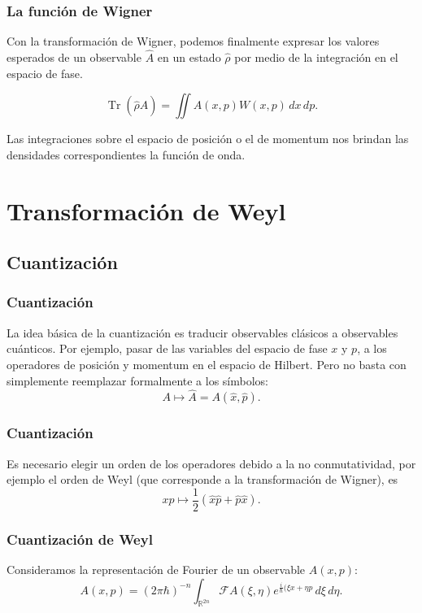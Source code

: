 \documentclass{beamer}
\DeclareMathOperator{\R}{\mathbb{R}}
\DeclareMathOperator{\Tr}{Tr}
\begin{document}
\begin{frame}
  \frametitle{La función de Wigner}

  Con la transformación de Wigner, podemos finalmente
  expresar los valores esperados de un observable $\hat{A}$
  en un estado $\hat{\rho}$ por medio de la integración en
  el espacio de fase.

  \begin{equation}
    \Tr\left( \hat{\rho}\hat{A} \right) 
    = \iint A(x,p) W(x,p) \, dx \, dp.
  \end{equation}

  Las integraciones sobre el espacio de posición o el de
  momentum nos brindan las densidades correspondientes la
  función de onda.
\end{frame}

\section{Transformación de Weyl}

\subsection{Cuantización}

\begin{frame}
  \frametitle{Cuantización}

  La idea básica de la cuantización es traducir observables
  clásicos a observables cuánticos. Por ejemplo, pasar de
  las variables del espacio de fase $x$ y $p$, a los
  operadores de posición y momentum en el espacio de
  Hilbert. Pero no basta con simplemente reemplazar
  formalmente a los símbolos:
  \[
    A \mapsto \hat{A} = A(\hat{x},\hat{p}).
  \] 
\end{frame}

\begin{frame}
  \frametitle{Cuantización}

  Es necesario elegir un orden de los operadores debido a la
  no conmutatividad, por ejemplo el orden de Weyl (que
  corresponde a la transformación de Wigner), es 
  \[
    xp \mapsto \frac{1}{2} \left( \hat{x}\hat{p} +
    \hat{p}\hat{x} \right). 
  \] 
\end{frame}

\begin{frame}
  \frametitle{Cuantización de Weyl}

  Consideramos la representación de Fourier de un observable
  $A(x,p)$:
  \begin{equation}
    A(x,p) = (2\pi\hbar)^{-n} \int_{\R^{2n}}
    \mathcal{F}A(\xi,\eta) e^{\frac{i}{\hbar} (\xi x + \eta
    p} \, d\xi \, d\eta.
  \end{equation}
\end{frame}
\end{document}

